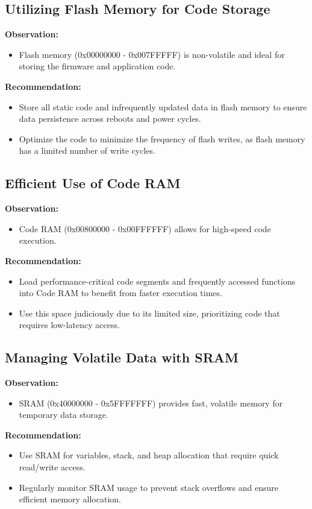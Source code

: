 \documentclass{Configuration_Files/PoliMi3i_thesis}
\begin{document}
\subsection{Utilizing Flash Memory for Code Storage}
\textbf{Observation:}
\begin{itemize}
    \item Flash memory (0x00000000 - 0x007FFFFF) is non-volatile and ideal for storing the firmware and application code.
\end{itemize}

\textbf{Recommendation:}
\begin{itemize}
    \item Store all static code and infrequently updated data in flash memory to ensure data persistence across reboots and power cycles.
    \item Optimize the code to minimize the frequency of flash writes, as flash memory has a limited number of write cycles.
\end{itemize}

\subsection{Efficient Use of Code RAM}
\textbf{Observation:}
\begin{itemize}
    \item Code RAM (0x00800000 - 0x00FFFFFF) allows for high-speed code execution.
\end{itemize}

\textbf{Recommendation:}
\begin{itemize}
    \item Load performance-critical code segments and frequently accessed functions into Code RAM to benefit from faster execution times.
    \item Use this space judiciously due to its limited size, prioritizing code that requires low-latency access.
\end{itemize}

\subsection{Managing Volatile Data with SRAM}
\textbf{Observation:}
\begin{itemize}
    \item SRAM (0x40000000 - 0x5FFFFFFF) provides fast, volatile memory for temporary data storage.
\end{itemize}

\textbf{Recommendation:}
\begin{itemize}
    \item Use SRAM for variables, stack, and heap allocation that require quick read/write access.
    \item Regularly monitor SRAM usage to prevent stack overflows and ensure efficient memory allocation.
\end{itemize}
\end{document}
